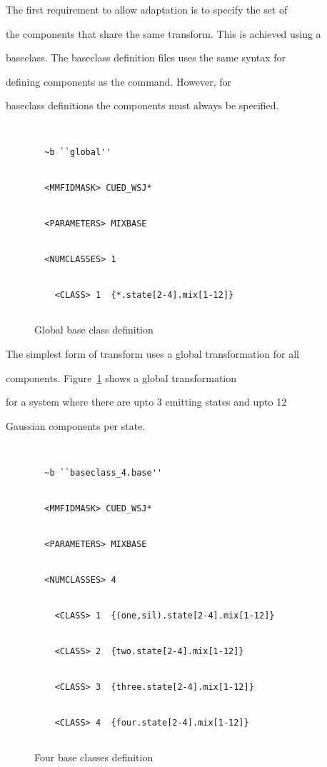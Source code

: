 

The first requirement to allow adaptation is to specify the set of


the components that share the same transform. This is achieved using a


baseclass.  The baseclass definition files uses the same syntax for


defining components as the  command. However, for


baseclass definitions the components must always be specified.





\begin{figure}[htbp]


\begin{verbatim}


  ~b ``global''


  <MMFIDMASK> CUED_WSJ* 


  <PARAMETERS> MIXBASE


  <NUMCLASSES> 1


    <CLASS> 1  {*.state[2-4].mix[1-12]}      


\end{verbatim}


\caption{Global base class definition}


\label{fig:globbase}


\end{figure}


The simplest form of transform uses a global transformation for all


components.  Figure~\ref{fig:globbase} shows a global transformation


for a system where there are upto 3 emitting states and upto 12


Gaussian components per state.





\begin{figure}[htbp]


\begin{verbatim}


  ~b ``baseclass_4.base''


  <MMFIDMASK> CUED_WSJ*


  <PARAMETERS> MIXBASE


  <NUMCLASSES> 4


    <CLASS> 1  {(one,sil).state[2-4].mix[1-12]}


    <CLASS> 2  {two.state[2-4].mix[1-12]}


    <CLASS> 3  {three.state[2-4].mix[1-12]}


    <CLASS> 4  {four.state[2-4].mix[1-12]}


\end{verbatim}


\caption{Four base classes definition}


\end{figure}





